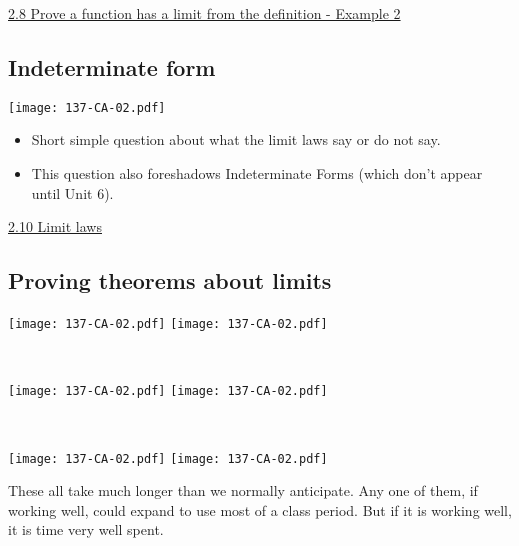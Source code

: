 \documentclass[11pt]{article}
\newcommand{\n}{\newpage}
\newcommand{\nl}{\hfill \vspace{-1.1\baselineskip}} %
\newcommand{\vviii}{\hspace{8mm} \href{https://www.youtube.com/watch?v=29jRJO_QSW4&list=PLlwePzQY_wW8P_I8BFgm0-upywEwTKd8_&index=8}{2.8 Prove a function has a limit from the definition - Example 2}}
\newcommand{\vx}{\hspace{8mm} \href{https://www.youtube.com/watch?v=nUepIw5kC2s&list=PLlwePzQY_wW8P_I8BFgm0-upywEwTKd8_&index=10}{2.10 Limit laws}}
\begin{document}
\vspace{-2mm}

\begin{videos}
\vviii
\end{videos}

\n
\newpage
\subsection{Indeterminate form} 

\begin{center}
{ \texttt{[image: 137-CA-02.pdf]}}
\end{center}

\begin{comments}
\nl
	\begin{itemize}
		\item Short simple question about what the limit laws say or do not say.
		\item  This question also foreshadows Indeterminate Forms (which don't appear until Unit 6).
	\end{itemize}
\end{comments}

\begin{videos}
\vx
\end{videos}

\n
\newpage
\subsection{Proving theorems about limits} \label{about_limits}

\begin{center}
{ \texttt{[image: 137-CA-02.pdf]}}
\quad
{ \texttt{[image: 137-CA-02.pdf]}}

\

{ \texttt{[image: 137-CA-02.pdf]}}
\quad
{ \texttt{[image: 137-CA-02.pdf]}}

\

{ \texttt{[image: 137-CA-02.pdf]}}
\quad
{ \texttt{[image: 137-CA-02.pdf]}}

\end{center}

\begin{warning}
	These all take much longer than we normally anticipate.  Any one of them, if working well, could expand to use most of a class period. But if it is working well, it is time very well spent.
\end{warning}
\end{document}
